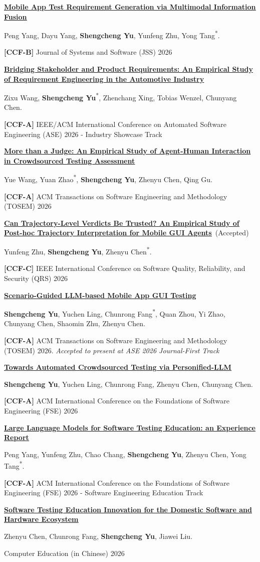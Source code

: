 \documentclass[12pt,a4paper]{article}
\newcommand{\me}{\textbf{Shengcheng Yu}}
\newcommand{\corr}{\textsuperscript{*}}
\newcommand{\ccf}[1]{\textbf{[#1]}}
\newcommand{\publication}[5]{%
  \begin{samepage}%
  \href{#5}{\textbf{\uline{#1}}}#2\par\nopagebreak[4]
  #3.\par\nopagebreak[4]
  #4\par
  \end{samepage}%
  \vspace{4.8pt}%
}
\begin{document}
\publication
{Mobile App Test Requirement Generation via Multimodal Information Fusion}
{}
{Peng Yang, Dayu Yang, \me, Yunfeng Zhu, Yong Tang\corr}
{\ccf{CCF-B} Journal of Systems and Software (JSS) 2026}
{https://doi.org/10.1016/j.jss.2026.113079}

\publication
{Bridging Stakeholder and Product Requirements: An Empirical Study of Requirement Engineering in the Automotive Industry}
{}
{Zixu Wang, \me\corr, Zhenchang Xing, Tobias Wenzel, Chunyang Chen}
{\ccf{CCF-A} IEEE/ACM International Conference on Automated Software Engineering (ASE) 2026 - Industry Showcase Track}
{https://doi.org/10.1145/3832783.3834456}

\publication
{More than a Judge: An Empirical Study of Agent-Human Interaction in Crowdsourced Testing Assessment}
{}
{Yue Wang, Yuan Zhao\corr, \me, Zhenyu Chen, Qing Gu}
{\ccf{CCF-A} ACM Transactions on Software Engineering and Methodology (TOSEM) 2026}
{https://doi.org/10.1145/3828168}

\publication
{Can Trajectory-Level Verdicts Be Trusted? An Empirical Study of Post-hoc Trajectory Interpretation for Mobile GUI Agents}
{\ (Accepted)}
{Yunfeng Zhu, \me, Zhenyu Chen\corr}
{\ccf{CCF-C} IEEE International Conference on Software Quality, Reliability, and Security (QRS) 2026}
{https://seysc.com}

\publication
{Scenario-Guided LLM-based Mobile App GUI Testing}
{}
{\me, Yuchen Ling, Chunrong Fang\corr, Quan Zhou, Yi Zhao, Chunyang Chen, Shaomin Zhu, Zhenyu Chen}
{\ccf{CCF-A} ACM Transactions on Software Engineering and Methodology (TOSEM) 2026. \textit{Accepted to present at ASE 2026 Journal-First Track}}
{https://doi.org/10.1145/3816025}

\publication
{Towards Automated Crowdsourced Testing via Personified-LLM}
{}
{\me, Yuchen Ling, Chunrong Fang, Zhenyu Chen, Chunyang Chen}
{\ccf{CCF-A} ACM International Conference on the Foundations of Software Engineering (FSE) 2026}
{https://doi.org/10.1145/3808173}

\publication
{Large Language Models for Software Testing Education: an Experience Report}
{}
{Peng Yang, Yunfeng Zhu, Chao Chang, \me, Zhenyu Chen, Yong Tang\corr}
{\ccf{CCF-A} ACM International Conference on the Foundations of Software Engineering (FSE) 2026 - Software Engineering Education Track}
{https://doi.org/10.1145/3803437.3805782}

\publication
{Software Testing Education Innovation for the Domestic Software and Hardware Ecosystem}
{}
{Zhenyu Chen, Chunrong Fang, \me, Jiawei Liu}
{Computer Education (in Chinese) 2026}
{http://doi.org/10.16512/j.cnki.jsjjy.2026.03.014}
\end{document}
